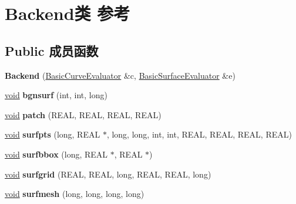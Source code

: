 \hypertarget{class_backend}{}\section{Backend类 参考}
\label{class_backend}
\subsection*{Public 成员函数}
\begin{DoxyCompactItemize}
\item 
\mbox{\label{class_backend_a281fd3d6bfef8dc4a99743beac97798b}} 
{\bfseries Backend} (\hyperlink{class_basic_curve_evaluator}{Basic\+Curve\+Evaluator} \&c, \hyperlink{class_basic_surface_evaluator}{Basic\+Surface\+Evaluator} \&e)
\item 
\mbox{\label{class_backend_a1f96e1ce61a6039f7b3c114f929e0617}} 
\hyperlink{interfacevoid}{void} {\bfseries bgnsurf} (int, int, long)
\item 
\mbox{\label{class_backend_a707e0672c74ccae473d58c471e9657f4}} 
\hyperlink{interfacevoid}{void} {\bfseries patch} (R\+E\+AL, R\+E\+AL, R\+E\+AL, R\+E\+AL)
\item 
\mbox{\label{class_backend_a906740db3832002148d8b75b7c2e0891}} 
\hyperlink{interfacevoid}{void} {\bfseries surfpts} (long, R\+E\+AL $\ast$, long, long, int, int, R\+E\+AL, R\+E\+AL, R\+E\+AL, R\+E\+AL)
\item 
\mbox{\label{class_backend_ac596f2947ebc6440c78420448a1541fd}} 
\hyperlink{interfacevoid}{void} {\bfseries surfbbox} (long, R\+E\+AL $\ast$, R\+E\+AL $\ast$)
\item 
\mbox{\label{class_backend_ad7c16a8ef5f051456b377d192844acca}} 
\hyperlink{interfacevoid}{void} {\bfseries surfgrid} (R\+E\+AL, R\+E\+AL, long, R\+E\+AL, R\+E\+AL, long)
\item 
\mbox{\label{class_backend_a6ae13015d1be09e07ea912527d20495d}} 
\hyperlink{interfacevoid}{void} {\bfseries surfmesh} (long, long, long, long)
\item 
\mbox{\label{class_backend_aac3bbe4d8625b978825af06e92509d81}} 

\end{DoxyCompactItemize}
